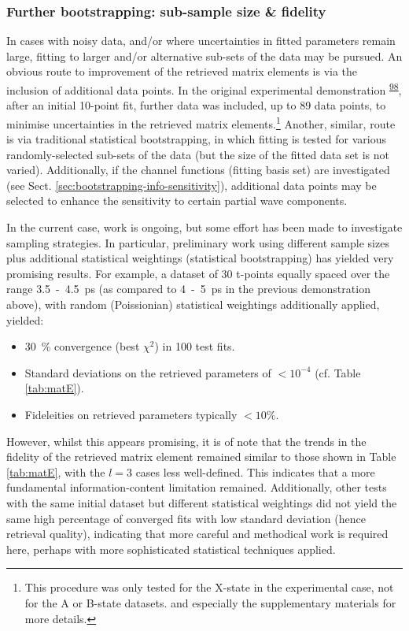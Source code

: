 \documentclass[10pt]{article}
\begin{document}

\subsubsection{Further bootstrapping: sub-sample size \& fidelity}

In cases with noisy data, and/or where uncertainties in fitted parameters remain large, fitting to larger and/or alternative sub-sets of the data may be pursued.
An obvious route to improvement of the retrieved matrix elements is via the inclusion of additional data points. In the original experimental demonstration \textsuperscript{\hyperref[csl:98]{98}}, after an initial 10-point fit, further data was included, up to 89 data points, to minimise uncertainties in the retrieved matrix elements.\footnote{This procedure was only tested for the X-state in the experimental case, not for the A or B-state datasets. %
and especially the supplementary materials for more details.} Another, similar, route is via traditional statistical bootstrapping, in which fitting is tested for various randomly-selected sub-sets of the data (but the size of the fitted data set is not varied). Additionally, if the channel functions (fitting basis set) are investigated (see Sect. \ref{sec:bootstrapping-info-sensitivity}), additional data points may be selected to enhance the sensitivity to certain partial wave components.

In the current case, work is ongoing, %
but some effort has been made to investigate sampling strategies. In particular, preliminary work using different sample sizes plus additional statistical weightings (statistical bootstrapping) has yielded very promising results. For example, a dataset of 30 t-points equally spaced over the range 3.5~-~4.5~ps (as compared to 4~-~5~ps in the previous demonstration above), with random (Poissionian) statistical weightings additionally applied, yielded:

\begin{itemize}
\item 30~\% convergence (best $\chi^2$) in 100 test fits.
\item Standard deviations on the retrieved parameters of $<10^{-4}$ (cf. Table \ref{tab:matE}).
\item Fideleities on retrieved parameters typically $<10\%$.
\end{itemize}

However, whilst this appears promising, it is of note that the trends in the fidelity of the retrieved matrix element remained similar to those shown in Table \ref{tab:matE}, with the $l=3$ cases less well-defined. This indicates that a more fundamental information-content limitation remained. Additionally, other tests with the same initial dataset but different statistical weightings did not yield the same high percentage of converged fits with low standard deviation (hence retrieval quality), indicating that more careful and methodical work is required here, perhaps with more sophisticated statistical techniques applied.
\end{document}
